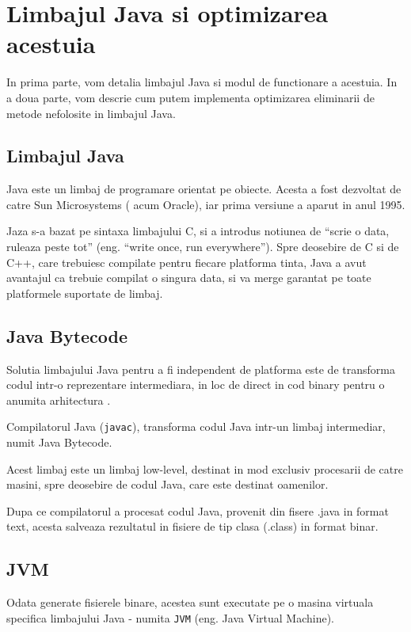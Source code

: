 \chapter{Limbajul Java si optimizarea acestuia}

In prima parte, vom detalia limbajul Java si modul de functionare
a acestuia.
In a doua parte, vom descrie cum putem implementa optimizarea
eliminarii de metode nefolosite in limbajul Java.

\section{Limbajul Java}

Java este un limbaj de programare orientat pe obiecte. Acesta a fost
dezvoltat de catre Sun Microsystems ( acum Oracle), iar prima versiune a
aparut in anul 1995.

Jaza s-a bazat pe sintaxa limbajului C, si a introdus notiunea de
``scrie o data, ruleaza peste tot'' (eng. ``write once, run
everywhere''). Spre deosebire de C si de C++, care trebuiesc compilate
pentru fiecare platforma tinta, Java a avut avantajul ca trebuie
compilat o singura data, si va merge garantat pe toate platformele
suportate de limbaj.

\section{Java Bytecode}

Solutia limbajului Java pentru a fi independent de platforma este de
transforma codul intr-o reprezentare intermediara, in loc de direct in
cod binary pentru o anumita arhitectura .

Compilatorul Java (\texttt{javac}), transforma codul Java intr-un limbaj
intermediar, numit Java Bytecode.

Acest limbaj este un limbaj low-level, destinat in mod exclusiv
procesarii de catre masini, spre deosebire de codul Java, care este
destinat oamenilor.

Dupa ce compilatorul a procesat codul Java, provenit din fisere .java in
format text, acesta salveaza rezultatul in fisiere de tip clasa (.class)
in format binar.

\section{JVM}

Odata generate fisierele binare, acestea sunt executate pe o masina
virtuala specifica limbajului Java - numita \texttt{JVM}
(eng. Java Virtual Machine).

